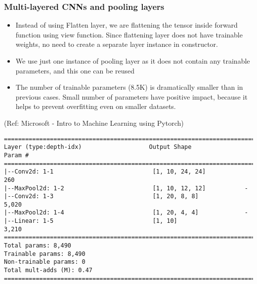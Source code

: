 \begin{frame}[fragile] \frametitle{Multi-layered CNNs and pooling layers}

\begin{itemize}

\item Instead of using Flatten layer, we are flattening the tensor inside forward function using view function. Since flattening layer does not have trainable weights, no need to create a separate layer instance in constructor.
\item We use just one instance of pooling layer as it does not contain any trainable parameters, and this one can be reused
\item The number of trainable parameters (8.5K) is dramatically smaller than in previous cases. Small number of parameters have positive impact, because it helps to prevent overfitting even on smaller datasets.
\end{itemize}


\tiny{(Ref: Microsoft - Intro to Machine Learning using Pytorch)}

\begin{lstlisting}
==========================================================================
Layer (type:depth-idx)                   Output Shape              Param #
==========================================================================
|--Conv2d: 1-1                            [1, 10, 24, 24]           260
|--MaxPool2d: 1-2                         [1, 10, 12, 12]           -
|--Conv2d: 1-3                            [1, 20, 8, 8]             5,020
|--MaxPool2d: 1-4                         [1, 20, 4, 4]             -
|--Linear: 1-5                            [1, 10]                   3,210
==========================================================================
Total params: 8,490
Trainable params: 8,490
Non-trainable params: 0
Total mult-adds (M): 0.47
==========================================================================
\end{lstlisting}


\end{frame}

